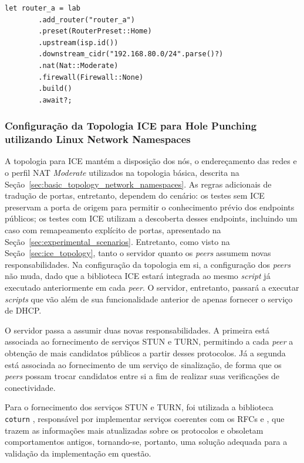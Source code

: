 \begin{lstlisting}[caption={Configuração de roteadores no PatchBay.}, label={lst:patchbay_client_config}]
    let router_a = lab
        .add_router("router_a")
        .preset(RouterPreset::Home)
        .upstream(isp.id())
        .downstream_cidr("192.168.80.0/24".parse()?)
        .nat(Nat::Moderate)
        .firewall(Firewall::None)
        .build()
        .await?;
\end{lstlisting}

\subsubsection{Configuração da Topologia ICE para Hole Punching utilizando Linux Network Namespaces}
\label{sec:ice_topology_network_namespaces}

A topologia para ICE mantém a disposição dos nós, o endereçamento das redes e o perfil NAT \textit{Moderate} utilizados na topologia básica, descrita na Seção~\ref{sec:basic_topology_network_namespaces}. As regras adicionais de tradução de portas, entretanto, dependem do cenário: os testes sem ICE preservam a porta de origem para permitir o conhecimento prévio dos endpoints públicos; os testes com ICE utilizam a descoberta desses endpoints, incluindo um caso com remapeamento explícito de portas, apresentado na Seção~\ref{sec:experimental_scenarios}. Entretanto, como visto na Seção~\ref{sec:ice_topology}, tanto o servidor quanto os \textit{peers} assumem novas responsabilidades. Na configuração da topologia em si, a configuração dos \textit{peers} não muda, dado que a biblioteca ICE estará integrada ao mesmo \textit{script} já executado anteriormente em cada \textit{peer}. O servidor, entretanto, passará a executar \textit{scripts} que vão além de sua funcionalidade anterior de apenas fornecer o serviço de DHCP.

O servidor passa a assumir duas novas responsabilidades. A primeira está associada ao fornecimento de serviços STUN e TURN, permitindo a cada \textit{peer} a obtenção de mais candidatos públicos a partir desses protocolos. Já a segunda está associada ao fornecimento de um serviço de sinalização, de forma que os \textit{peers} possam trocar candidatos entre si a fim de realizar suas verificações de conectividade.

Para o fornecimento dos serviços STUN e TURN, foi utilizada a biblioteca \texttt{coturn} \citep{coturn}, responsável por implementar serviços coerentes com os RFCs \citep{rfc8489} e \citep{rfc8656}, que trazem as informações mais atualizadas sobre os protocolos e obsoletam comportamentos antigos, tornando-se, portanto, uma solução adequada para a validação da implementação em questão.

